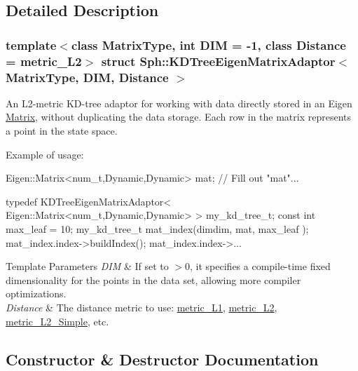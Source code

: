 \subsection{Detailed Description}
\subsubsection*{template$<$class Matrix\+Type, int D\+IM = -\/1, class Distance = metric\+\_\+\+L2$>$\newline
struct Sph\+::\+K\+D\+Tree\+Eigen\+Matrix\+Adaptor$<$ Matrix\+Type, D\+I\+M, Distance $>$}

An L2-\/metric K\+D-\/tree adaptor for working with data directly stored in an Eigen \hyperlink{classMatrix}{Matrix}, without duplicating the data storage. Each row in the matrix represents a point in the state space.

Example of usage\+: 
\begin{DoxyCode}
Eigen::Matrix<num\_t,Dynamic,Dynamic>  mat;
\textcolor{comment}{// Fill out "mat"...}

\textcolor{keyword}{typedef} KDTreeEigenMatrixAdaptor< Eigen::Matrix<num\_t,Dynamic,Dynamic> >  my\_kd\_tree\_t;
\textcolor{keyword}{const} \textcolor{keywordtype}{int} max\_leaf = 10;
my\_kd\_tree\_t   mat\_index(dimdim, mat, max\_leaf );
mat\_index.index->buildIndex();
mat\_index.index->...
\end{DoxyCode}



\begin{DoxyTemplParams}{Template Parameters}
{\em D\+IM} & If set to $>$0, it specifies a compile-\/time fixed dimensionality for the points in the data set, allowing more compiler optimizations. \\
\hline
{\em Distance} & The distance metric to use\+: \hyperlink{structSph_1_1metric__L1}{metric\+\_\+\+L1}, \hyperlink{structSph_1_1metric__L2}{metric\+\_\+\+L2}, \hyperlink{structSph_1_1metric__L2__Simple}{metric\+\_\+\+L2\+\_\+\+Simple}, etc. \\
\hline
\end{DoxyTemplParams}


\subsection{Constructor \& Destructor Documentation}
\hypertarget{structSph_1_1KDTreeEigenMatrixAdaptor_a9968b3bdc08f148f419432a8339f1167}{}\label{structSph_1_1KDTreeEigenMatrixAdaptor_a9968b3bdc08f148f419432a8339f1167} 
